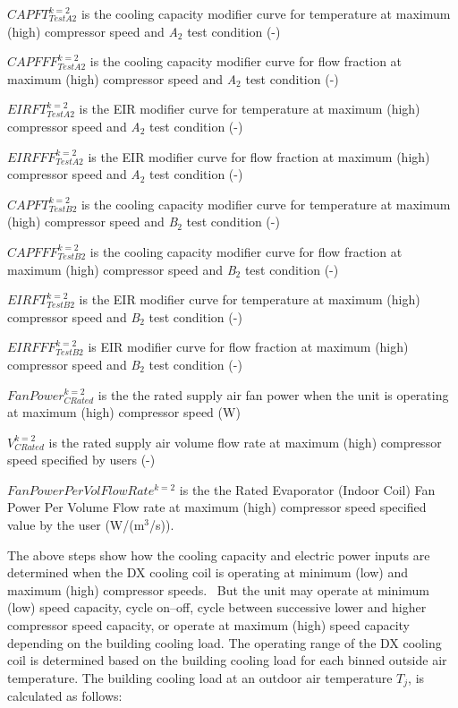 \(CAPFT_{TestA2}^{k = 2}\) is the cooling capacity modifier curve for temperature at maximum (high) compressor speed and \emph{A}\(_{2}\) test condition (-)

\(CAPFFF_{TestA2}^{k = 2}\) is the cooling capacity modifier curve for flow fraction at maximum (high) compressor speed and \emph{A}\(_{2}\) test condition (-)

\(EIRFT_{TestA2}^{k = 2}\) is the EIR modifier curve for temperature at maximum (high) compressor speed and \emph{A}\(_{2}\) test condition (-)

\(EIRFFF_{TestA2}^{k = 2}\) is the EIR modifier curve for flow fraction at maximum (high)~ compressor speed and \emph{A}\(_{2}\) test condition (-)

\(CAPFT_{TestB2}^{k = 2}\) is the cooling capacity modifier curve for temperature at maximum (high) compressor speed and \emph{B}\(_{2}\) test condition (-)

\(CAPFFF_{TestB2}^{k = 2}\) is the cooling capacity modifier curve for flow fraction at maximum (high) compressor speed and \emph{B}\(_{2}\) test condition (-)

\(EIRFT_{TestB2}^{k = 2}\) is the EIR modifier curve for temperature at maximum (high) compressor speed and \emph{B}\(_{2}\) test condition (-)

\(EIRFFF_{TestB2}^{k = 2}\) is EIR modifier curve for flow fraction at maximum (high) compressor speed and \emph{B}\(_{2}\) test condition (-)

\(FanPower_{CRated}^{k = 2}\) is the the rated supply air fan power when the unit is operating at maximum (high) compressor speed (W)

\(V_{CRated}^{k = 2}\) is the rated supply air volume flow rate at maximum (high) compressor speed specified by users (-)

\(FanPowerPerVolFlowRat{e^{k = 2}}\) is the the Rated Evaporator (Indoor Coil) Fan Power Per Volume Flow rate at maximum (high) compressor speed specified value by the user (W/(m\(^3\)/s)).

The above steps show how the cooling capacity and electric power inputs are determined when the DX cooling coil is operating at minimum (low) and maximum (high) compressor speeds.~ But the unit may operate at minimum (low) speed capacity, cycle on--off, cycle between successive lower and higher compressor speed capacity, or operate at maximum (high) speed capacity depending on the building cooling load. The operating range of the DX cooling coil is determined based on the building cooling load for each binned outside air temperature. The building cooling load at an outdoor air temperature \(T_{j}\), is calculated as follows:

